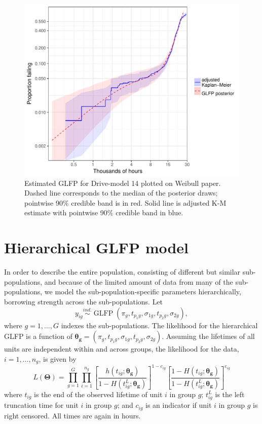 \documentclass[aoas]{imsart}
\newcommand{\ind}{\stackrel{ind.}{\sim}}
\newcommand{\op}{\operatorname}
\begin{document}
\begin{figure}[H]
\centering
  \includegraphics[width=.8\textwidth]{km14-prob-plus}
  \caption{Estimated GLFP for Drive-model 14 plotted on Weibull paper.  Dashed line corresponds to the median of the posterior draws; pointwise 90\% credible band is in red.  Solid line is adjusted K-M estimate with pointwise 90\% credible band in blue.}
  \label{ex1-overlay}
\end{figure}


\section{Hierarchical GLFP model}
\label{sec:Hierarchical GLFP model}

In order to describe the entire population, consisting of different but similar sub-populations, and because of the limited amount of data from many of the sub-populations, we model the sub-population-specific parameters hierarchically, borrowing strength across the sub-populations.  Let
\begin{equation}
y_{ig} \ind \op{GLFP}\left( \pi_g, t_{p_{1}g}, \sigma_{1g}, t_{p_{2}g}, \sigma_{2g} \right),
\end{equation}
where $g=1,\ldots,G$ indexes the sub-populations.  The likelihood for the hierarchical GLFP is a function of $\bm{\theta_g} = (\pi_{g}, t_{p_{1}g}, \sigma_{1g}, t_{p_{2}g}, \sigma_{2g})$.  Assuming the lifetimes of all units are independent within and across groups, the likelihood for the data, $i=1,\dots,n_g$,  is given by
\begin{equation*}
L(\bm{\Theta})= \prod_{g=1}^{G} \prod_{i=1}^{n_{g}} \left[\frac{h(t_{ig};\bm{\theta_g})}{1-H(t_{ig}^L;\bm{\theta_g})}\right]^{1-c_{ig}} \left[ \frac{1-H(t_{ig};\bm{\theta_g})}{1-H(t_{ig}^L;\bm{\theta_g})} \right]^{c_{ig}}
\end{equation*}
where $t_{ig}$ is the end of the observed lifetime of unit $i$ in group $g$; $t_{ig}^L$ is the left truncation time for unit $i$ in group $g$; and $c_{ig}$ is an indicator if unit $i$ in group $g$ is right censored.  All times are again in hours.
\end{document}
